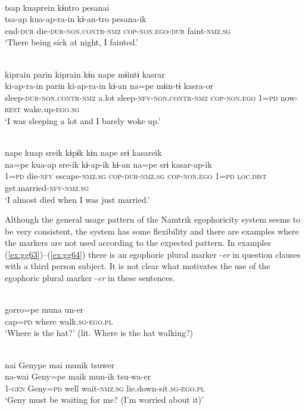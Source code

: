 \documentclass[output=paper]{langsci/langscibook}
\begin{document}
\ea \label{ex:gg60}
\\
	\glll tsap kuaprein kɨntro pesanai\\
	tsa-ap	kua-ap-ra-in kɨ-an-tro	pesana-ik\\
	end-\textsc{dur} die-\textsc{dur-non.contr-nmz} \textsc{cop-non.ego-dub} faint-\textsc{nmz.sg}\\
	\glt ‘There being sick at night, I fainted.’  
\z

\ea \label{ex:gg61}
\\
	\glll kiprain	parin	kiprain	kɨn nape	mɨintɨ	kasrar\\
	ki-ap-ra-in	parin	ki-ap-ra-in	kɨ-an na=pe	mɨin-tɨ	kasra-or\\
	sleep-\textsc{dur-non.contr-nmz} a.lot sleep-\textsc{nfv-non.contr-nmz} \textsc{cop-non.ego} 1=\textsc{pd} now-\textsc{rest} wake.up-\textsc{ego.sg}\\
	\glt ‘‎‎I was sleeping a lot and I barely woke up.’ 
\z


\ea \label{ex:gg62}
\\
	\glll nape	kuap	sreik	kɨpɨk	kɨn nape	srɨ	kasareik\\
	na=pe kua-ap sre-ik	kɨ-ap-ik kɨ-an na=pe srɨ kasar-ap-ik\\
	1=\textsc{pd}	 die-\textsc{nfv} escape-\textsc{nmz.sg} \textsc{cop-dur-nmz.sg} \textsc{cop-non.ego} 1=\textsc{pd} \textsc{loc.dist}	get.married-\textsc{nfv-nmz.sg}\\
	\glt ‘I almost died when I was just married.’ 
\z


Although the general usage pattern of the Namtrik egophoricity system seems to be very consistent, the system has some flexibility and there are examples where the markers are not used according to the expected pattern. In examples (\ref{ex:gg63})--(\ref{ex:gg64}) there is an egophoric plural marker -\textit{er} in question clauses with a third person subject. It is not clear what motivates the use of the egophoric plural marker -\textit{er} in these sentences. 


\ea \label{ex:gg63}
\\
	\gll gorro=pe	muna	un-er\\
	cap=\textsc{pd}	where	walk.\textsc{sg}-\textsc{ego.pl}\\
	\glt‘Where is the hat?’ (lit. Where is the hat walking?)
\z 

\ea \label{ex:gg64}
\\
	\glll nai Genype mai munik tsuwer\\
	na-wai	Geny=pe	maik mun-ik	tsu-wa-er\\
	1-\textsc{gen}	Geny=\textsc{pd}	well	wait-\textsc{nmz.sg}	lie.down-sit.\textsc{sg}-\textsc{ego.pl}\\
	\glt ‘Geny must be waiting for me? (I’m worried about it)’
\z 
\end{document}
